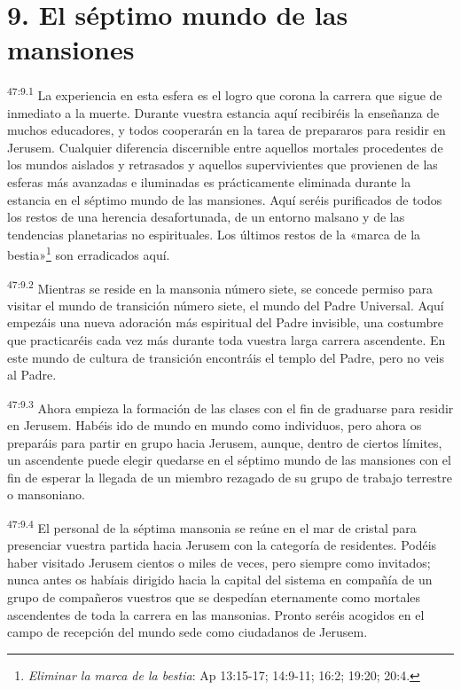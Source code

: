 \section*{9. El séptimo mundo de las mansiones}
\par
\textsuperscript{47:9.1} La experiencia en esta esfera es el logro que corona la carrera que sigue de inmediato a la muerte. Durante vuestra estancia aquí recibiréis la enseñanza de muchos educadores, y todos cooperarán en la tarea de prepararos para residir en Jerusem. Cualquier diferencia discernible entre aquellos mortales procedentes de los mundos aislados y retrasados y aquellos supervivientes que provienen de las esferas más avanzadas e iluminadas es prácticamente eliminada durante la estancia en el séptimo mundo de las mansiones. Aquí seréis purificados de todos los restos de una herencia desafortunada, de un entorno malsano y de las tendencias planetarias no espirituales. Los últimos restos de la «marca de la bestia»\footnote{\textit{Eliminar la marca de la bestia}: Ap 13:15-17; 14:9-11; 16:2; 19:20; 20:4.} son erradicados aquí.

\par
\textsuperscript{47:9.2} Mientras se reside en la mansonia número siete, se concede permiso para visitar el mundo de transición número siete, el mundo del Padre Universal. Aquí empezáis una nueva adoración más espiritual del Padre invisible, una costumbre que practicaréis cada vez más durante toda vuestra larga carrera ascendente. En este mundo de cultura de transición encontráis el templo del Padre, pero no veis al Padre.

\par
\textsuperscript{47:9.3} Ahora empieza la formación de las clases con el fin de graduarse para residir en Jerusem. Habéis ido de mundo en mundo como individuos, pero ahora os preparáis para partir en grupo hacia Jerusem, aunque, dentro de ciertos límites, un ascendente puede elegir quedarse en el séptimo mundo de las mansiones con el fin de esperar la llegada de un miembro rezagado de su grupo de trabajo terrestre o mansoniano.

\par
\textsuperscript{47:9.4} El personal de la séptima mansonia se reúne en el mar de cristal para presenciar vuestra partida hacia Jerusem con la categoría de residentes. Podéis haber visitado Jerusem cientos o miles de veces, pero siempre como invitados; nunca antes os habíais dirigido hacia la capital del sistema en compañía de un grupo de compañeros vuestros que se despedían eternamente como mortales ascendentes de toda la carrera en las mansonias. Pronto seréis acogidos en el campo de recepción del mundo sede como ciudadanos de Jerusem.

